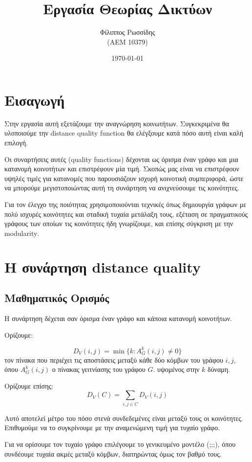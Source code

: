 \documentclass[12pt, letterpaper]{article}
\title{Εργασία Θεωρίας Δικτύων }
\author{Φίλιππος Ρωσσίδης \\ (ΑΕΜ 10379)}
\date{\today}
\begin{document}
\maketitle

\section{Εισαγωγή}

Στην εργασία αυτή εξετάζουμε την αναγνώρηση κοινωτήτων. Συγκεκριμένα θα 
υλοποιούμε την 
\textlatin{distance quality function}  θα ελέγξουμε κατά πόσο αυτή είναι καλή
επιλογή. 

Οι συναρτήσεις αυτές (\textlatin{quality functions}) δέχονται ως όρισμα έναν
γράφο και μια κατανομή κοινοτήτων και επιστρέφουν μία τιμή. Σκοπώς μας είναι 
να επιστρέφουν υψηλές τιμές για κατανομές που παρουσιάζουν ισχυρή κοινοτική συμπεριφορά,
ώστε να μπορούμε μεγιστοποιώντας αυτή τη συνάρτηση να ανιχνεύσουμε τις κοινότητες.

Για τον έλεγχο της ποιότητας χρησιμοποιούνται τεχνικές όπως δημιουργία γράφων 
με πολύ ισχυρές κοινότητες και σταδική τυχαία μετάλαξη τους, εξέταση σε πραγματικούς 
γράφους των οποίων τις κοινότητες ήδη γνωρίζουμε, και επίσης σύγκριση με 
την \textlatin{modularity}.

\section{Η συνάρτηση \textlatin{distance quality}}

\subsection{Μαθηματικός Ορισμός}

Η συνάρτηση δέχεται σαν όρισμα έναν γράφο και κάποια κατανομή κοινοτήτων.

Ορίζουμε:

\[ D_V(i,j) = \min \{ k:A^k_G (i,j) \neq 0 \} \]
τον πίνακα που περιέχει τις αποστάσεις μεταξύ κάθε δύο κόμβων του γράφου 
$i,j$, όπου $A^k_G(i,j)$ ο πίνακας γειτνίασης του γράφου $G$. υψομένος στην $k$
δύναμη. 

Ορίζουμε επίσης:
\[ D_V(C) = \sum_{i,j \in C} D_V(i,j) \]

Αυτό αποτελεί μέτρο του πόσο στενά συνδεδεμένες είναι μεταξύ τους 
οι κοινότητες. Επιθυμούμε να το συγκρίνουμε με την αναμενώμενη τιμή 
για τυχαίο γράφο.

Για να ορίσουμε τον τυχαίο γράφο επιλέγουμε το γενικευμένο μοντέλο (;;;),
όπου συνδέουμε τυχαία ακμές μεταξύ κόμβων, διατηρώντας όμως τον βαθμό τους.
\end{document}
